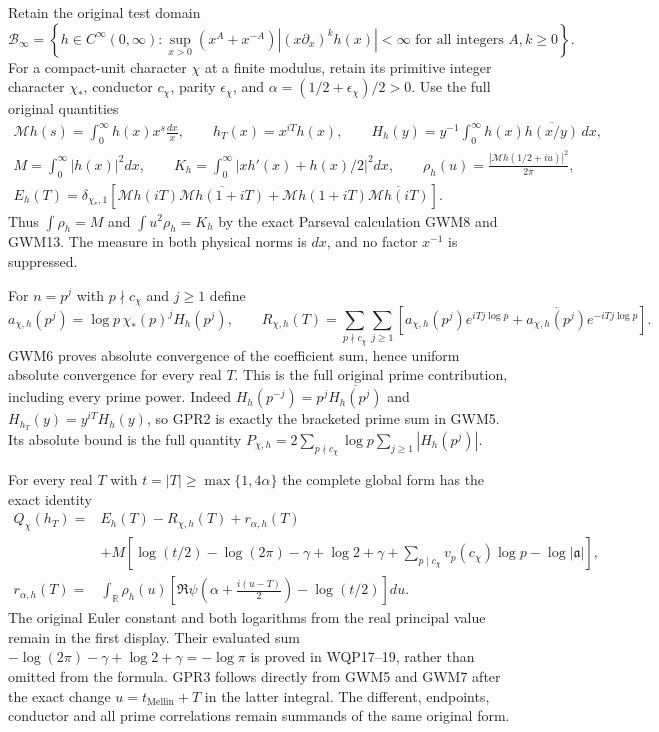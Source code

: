 Retain the original test domain
\[
 \mathcal B_\infty=\left\{h\in C^\infty(0,\infty):
 \sup_{x>0}(x^A+x^{-A})|(x\partial_x)^k h(x)|<\infty
 \text{ for all integers }A,k\ge0\right\}.
\]
For a compact-unit character $\chi$ at a finite modulus, retain its
primitive integer character $\chi_*$, conductor $c_\chi$, parity
$\epsilon_\chi$, and $\alpha=(1/2+\epsilon_\chi)/2>0$.
Use the full original quantities
\begin{equation}\tag{GPR1}
 \begin{gathered}
 \mathcal Mh(s)=\int_0^\infty h(x)x^s\frac{dx}{x},\qquad
 h_T(x)=x^{iT}h(x),\qquad
 H_h(y)=y^{-1}\int_0^\infty h(x)\overline{h(x/y)}\,dx,\\
 M=\int_0^\infty|h(x)|^2dx,\qquad
 K_h=\int_0^\infty|xh'(x)+h(x)/2|^2dx,\qquad
 \rho_h(u)=\frac{|\mathcal Mh(1/2+iu)|^2}{2\pi},\\
 E_h(T)=\delta_{\chi_*,1}
 \left[\mathcal Mh(iT)\overline{\mathcal Mh(1+iT)}
       +\mathcal Mh(1+iT)\overline{\mathcal Mh(iT)}\right].
 \end{gathered}
\end{equation}
Thus $\int\rho_h=M$ and $\int u^2\rho_h=K_h$ by the exact
Parseval calculation GWM8 and GWM13. The measure in both physical
norms is $dx$, and no factor $x^{-1}$ is suppressed.

For $n=p^j$ with $p\nmid c_\chi$ and $j\ge1$ define
\begin{equation}\tag{GPR2}
 a_{\chi,h}(p^j)=\log p\,\chi_*(p)^j H_h(p^j),\qquad
 R_{\chi,h}(T)=
 \sum_{p\nmid c_\chi}\sum_{j\ge1}
 \left[a_{\chi,h}(p^j)e^{iTj\log p}
       +\overline{a_{\chi,h}(p^j)}e^{-iTj\log p}\right].
\end{equation}
GWM6 proves absolute convergence of the coefficient sum, hence
uniform absolute convergence for every real $T$.
This is the full original prime contribution, including every
prime power. Indeed
$H_h(p^{-j})=p^j\overline{H_h(p^j)}$ and
$H_{h_T}(y)=y^{iT}H_h(y)$, so GPR2 is exactly the bracketed
prime sum in GWM5. Its absolute bound is the full quantity
$P_{\chi,h}=2\sum_{p\nmid c_\chi}\log p\sum_{j\ge1}|H_h(p^j)|$.

For every real $T$ with $t=|T|\ge\max\{1,4\alpha\}$ the complete
global form has the exact identity
\begin{equation}\tag{GPR3}
 \begin{split}
 Q_\chi(h_T)={}&E_h(T)-R_{\chi,h}(T)+r_{\alpha,h}(T)\\
 &+M\left[
 \log(t/2)-\log(2\pi)-\gamma+\log2+\gamma
 +\sum_{p\mid c_\chi}v_p(c_\chi)\log p-\log|\mathfrak a|
 \right],\\
 r_{\alpha,h}(T)={}&
 \int_{\mathbb R}\rho_h(u)
 \left[
   \Re\psi\left(\alpha+\frac{i(u-T)}2\right)-\log(t/2)
 \right]du.
 \end{split}
\end{equation}
The original Euler constant and both logarithms from the real
principal value remain in the first display. Their evaluated
sum $-\log(2\pi)-\gamma+\log2+\gamma=-\log\pi$ is proved in
WQP17--19, rather than omitted from the formula.
GPR3 follows directly from GWM5 and GWM7 after the exact change
$u=t_{\mathrm{Mellin}}+T$ in the latter integral.
The different, endpoints, conductor and all prime correlations
remain summands of the same original form.

